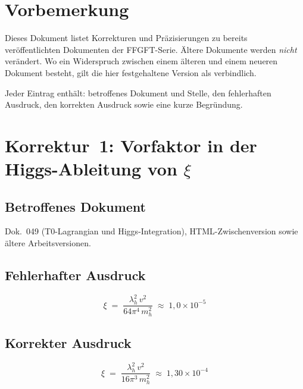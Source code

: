 
\section*{Vorbemerkung}

Dieses Dokument listet Korrekturen und Präzisierungen zu bereits
veröffentlichten Dokumenten der FFGFT-Serie. Ältere Dokumente werden
\emph{nicht} verändert. Wo ein Widerspruch zwischen einem älteren und
einem neueren Dokument besteht, gilt die hier festgehaltene Version als
verbindlich.

Jeder Eintrag enthält: betroffenes Dokument und Stelle, den fehlerhaften
Ausdruck, den korrekten Ausdruck sowie eine kurze Begründung.

\section{Korrektur~1: Vorfaktor in der Higgs-Ableitung von $\xi$}

\subsection*{Betroffenes Dokument}

Dok.~049 (T0-Lagrangian und Higgs-Integration), HTML-Zwischenversion
sowie ältere Arbeitsversionen.

\subsection*{Fehlerhafter Ausdruck}

\begin{equation}
  \xi \;=\; \frac{\lambda_h^2\, v^2}{64\pi^4\, m_h^2}
  \;\approx\; 1{,}0 \times 10^{-5}
  \tag{alt -- falsch}
\end{equation}

\subsection*{Korrekter Ausdruck}

\begin{equation}
  \boxed{
    \xi \;=\; \frac{\lambda_h^2\, v^2}{16\pi^3\, m_h^2}
    \;\approx\; 1{,}30 \times 10^{-4}
  }
  \tag{186.1}
\end{equation}

